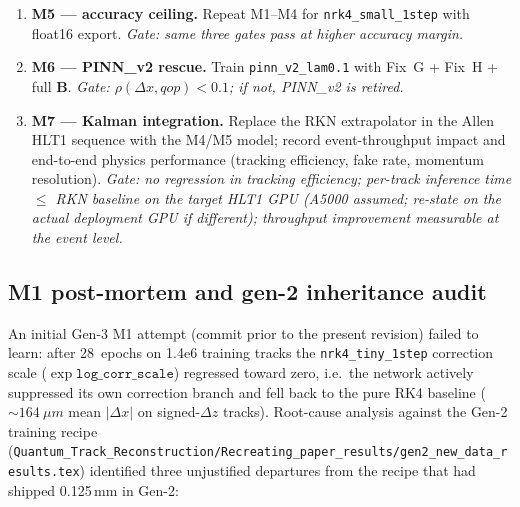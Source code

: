 \documentclass[a4paper,11pt]{article}
\newcommand{\SI}[2]{#1~#2}
\newcommand{\num}[1]{#1}
\newcommand{\dz}{\Delta z}
\newcommand{\Bfield}{\mathbf{B}}
\begin{document}
\begin{enumerate}
        hidden-dim choice until all three gates pass.  \emph{Gate:
        G1$<2.0$, $|$G2$|<1\,\%$, G3$<1.5$ simultaneously.}
  \item \textbf{M5 --- accuracy ceiling.}  Repeat M1--M4 for
        \texttt{nrk4\_small\_1step} with float16 export.  \emph{Gate:
        same three gates pass at higher accuracy margin.}
  \item \textbf{M6 --- PINN\_v2 rescue.}  Train
        \texttt{pinn\_v2\_lam0.1} with Fix~G + Fix~H + full
        $\Bfield$.  \emph{Gate: $\rho(\Delta x,qop)<0.1$; if not,
        PINN\_v2 is retired.}
  \item \textbf{M7 --- Kalman integration.}  Replace the RKN
        extrapolator in the Allen HLT1 sequence with the M4/M5
        model; record event-throughput impact and end-to-end
        physics performance (tracking efficiency, fake rate,
        momentum resolution).  \emph{Gate: no regression in
        tracking efficiency; per-track inference time $\le$ RKN
        baseline on the target HLT1 GPU (A5000 assumed; re-state
        on the actual deployment GPU if different); throughput
        improvement measurable at the event level.}
\end{enumerate}

\subsection{M1 post-mortem and gen-2 inheritance audit}
\label{gen3:sec:m1_postmortem}

An initial Gen-3 M1 attempt (commit prior to the present revision)
failed to learn: after 28~epochs on \num{1.4e6} training tracks the
\texttt{nrk4\_tiny\_1step} correction scale
($\exp \mathtt{log\_corr\_scale}$) regressed toward zero, i.e.\ the
network actively suppressed its own correction branch and fell back to
the pure RK4 baseline ($\sim\SI{164}{\mu m}$ mean $|\Delta x|$ on
signed-$\dz$ tracks).  Root-cause analysis against the Gen-2 training
recipe (\texttt{Quantum\_Track\_Reconstruction/Recreating\_paper\_results/gen2\_new\_data\_results.tex})
identified three unjustified departures from the recipe that had
shipped 0.125\,mm in Gen-2:
\end{document}
